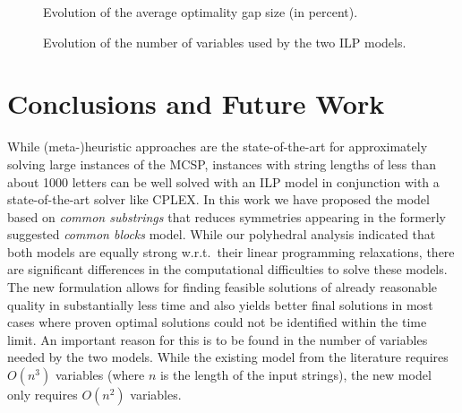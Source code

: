 \documentclass[11pt,a4paper]{article}
\begin{document}
\begin{figure}[!t]
\centering
{}
\caption{Evolution of the average optimality gap size (in percent).}
\label{fig:gapsize}
\end{figure}

\begin{figure}[!t]
\centering
{}
\caption{Evolution of the number of variables used by the two ILP models.}
\label{fig:variables}
\end{figure}


\section{Conclusions and Future Work}
\label{sec:conclusions}

While (meta-)heuristic approaches are the state-of-the-art for
approximately solving large instances of the MCSP, instances with string
lengths of less than about 1000 letters can be well solved with 
an ILP model in conjunction with a state-of-the-art solver like CPLEX. 
In this work we have proposed the model based on \emph{common substrings} that
reduces symmetries appearing in the formerly suggested \emph{common blocks}
model. While our polyhedral analysis indicated that both models are
equally strong w.r.t.\ their linear programming relaxations, there are
significant differences in the computational difficulties to solve these
models. The new formulation allows for finding feasible solutions of
already reasonable quality in substantially less time and also yields 
better final solutions in most cases where proven optimal solutions could not 
be identified within the time limit. An important reason for this is to be found in the number of variables needed by the two models. While the existing model from the literature requires $O(n^3)$ variables (where $n$ is the length of the input strings), the new model only requires $O(n^2)$ variables.
\end{document}
